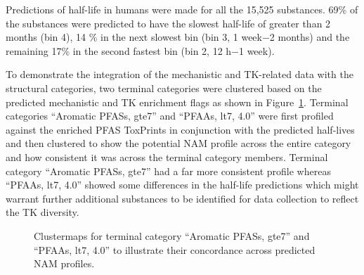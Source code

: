 \documentclass[
  super,
  preprint,
  3p]{elsarticle}
\begin{document}
Predictions of half-life in humans were made for all the 15,525
substances. 69\% of the substances were predicted to have the slowest
half-life of greater than 2 months (bin 4), 14 \% in the next slowest
bin (bin 3, 1 week−2 months) and the remaining 17\% in the second
fastest bin (bin 2, 12 h−1 week).

To demonstrate the integration of the mechanistic and TK-related data
with the structural categories, two terminal categories were clustered
based on the predicted mechanistic and TK enrichment flags as shown in
Figure~\ref{fig-hmnams}. Terminal categories ``Aromatic PFASs, gte7''
and ``PFAAs, lt7, 4.0'' were first profiled against the enriched PFAS
ToxPrints in conjunction with the predicted half-lives and then
clustered to show the potential NAM profile across the entire category
and how consistent it was across the terminal category members. Terminal
category ``Aromatic PFASs, gte7'' had a far more consistent profile
whereas ``PFAAs, lt7, 4.0'' showed some differences in the half-life
predictions which might warrant further additional substances to be
identified for data collection to reflect the TK diversity.

\begin{figure}

\begin{minipage}[t]{0.50\linewidth}

{\centering 


}

\end{minipage}%
%
\begin{minipage}[t]{0.50\linewidth}

{\centering 


}

\end{minipage}%

\caption{\label{fig-hmnams}Clustermaps for terminal category ``Aromatic
PFASs, gte7'' and ``PFAAs, lt7, 4.0'' to illustrate their concordance
across predicted NAM profiles.}

\end{figure}
\end{document}
